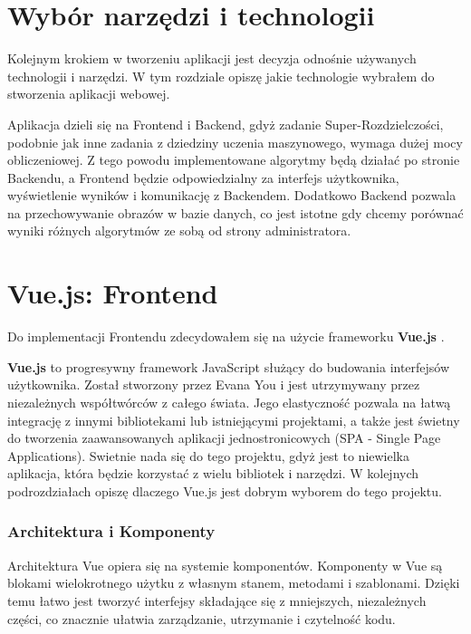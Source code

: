 \section{Wybór narzędzi i technologii}

Kolejnym krokiem w tworzeniu aplikacji jest decyzja odnośnie używanych technologii i narzędzi. W tym rozdziale opiszę jakie technologie wybrałem do stworzenia aplikacji webowej. 

Aplikacja dzieli się na Frontend i Backend, gdyż zadanie Super-Rozdzielczości, podobnie jak inne zadania z dziedziny uczenia maszynowego, wymaga dużej mocy obliczeniowej. Z tego powodu implementowane algorytmy będą działać po stronie Backendu, a Frontend będzie odpowiedzialny za interfejs użytkownika, wyświetlenie wyników i komunikację z Backendem. 
Dodatkowo Backend pozwala na przechowywanie obrazów w bazie danych, co jest istotne gdy chcemy porównać wyniki różnych algorytmów ze sobą od strony administratora.


\section{Vue.js: Frontend}

Do implementacji Frontendu zdecydowałem się na użycie frameworku \textbf{Vue.js} \cite{vusjs}.


\textbf{Vue.js} to progresywny framework JavaScript służący do budowania interfejsów użytkownika. Został stworzony przez Evana You i jest utrzymywany przez niezależnych współtwórców z całego świata. Jego elastyczność pozwala na łatwą integrację z innymi bibliotekami lub istniejącymi projektami, a także jest świetny do tworzenia zaawansowanych aplikacji jednostronicowych (SPA - Single Page Applications). Swietnie nada się do tego projektu, gdyż jest to niewielka aplikacja, która będzie korzystać z wielu bibliotek i narzędzi. W kolejnych podrozdziałach opiszę dlaczego Vue.js jest dobrym wyborem do tego projektu.


\subsubsection*{Architektura i Komponenty}

Architektura Vue opiera się na systemie komponentów. Komponenty w Vue są blokami wielokrotnego użytku z własnym stanem, metodami i szablonami. Dzięki temu łatwo jest tworzyć interfejsy składające się z mniejszych, niezależnych części, co znacznie ułatwia zarządzanie, utrzymanie i czytelność kodu.

